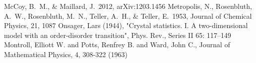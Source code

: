 \documentclass[]{article}
\begin{document}
\begin{thebibliography}{}
		McCoy, B.~M., \& Maillard, J.\ 2012, arXiv:1203.1456 
		Metropolis, N., Rosenbluth, A.~W., Rosenbluth, M.~N., Teller, A.~H., \& Teller, E.\ 1953, Journal of Chemical Physics, 21, 1087 
		Onsager, Lars (1944), "Crystal statistics. I. A two-dimensional model with an order-disorder transition", Phys. Rev., Series II 65: 117–149
		Montroll, Elliott W. and Potts, Renfrey B. and Ward, John C., Journal of Mathematical Physics, 4, 308-322 (1963)
\end{thebibliography}
\end{document}
